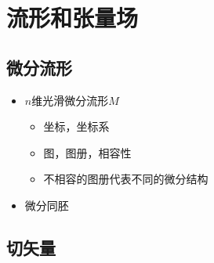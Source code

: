 \chapter{流形和张量场}

\section{微分流形}

\begin{itemize}
    \item $n$维光滑微分流形$M$
    \begin{itemize}
        \item 坐标，坐标系
        \item 图，图册，相容性
        \item 不相容的图册代表不同的微分结构
    \end{itemize}
    \item 微分同胚
\end{itemize}

\section{切矢量}

